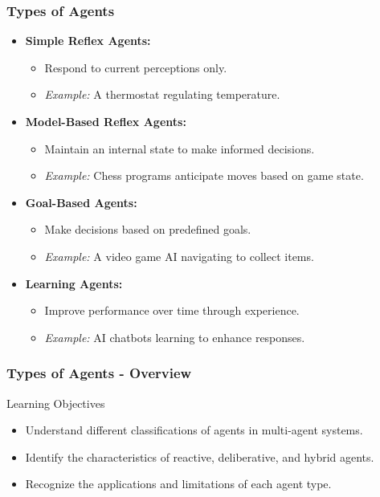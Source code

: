 \documentclass[aspectratio=169]{beamer}
\begin{document}
\begin{frame}[fragile]
    \frametitle{Types of Agents}
    \begin{itemize}
        \item \textbf{Simple Reflex Agents:} 
        \begin{itemize}
            \item Respond to current perceptions only.
            \item \textit{Example:} A thermostat regulating temperature.
        \end{itemize}

        \item \textbf{Model-Based Reflex Agents:} 
        \begin{itemize}
            \item Maintain an internal state to make informed decisions.
            \item \textit{Example:} Chess programs anticipate moves based on game state.
        \end{itemize}

        \item \textbf{Goal-Based Agents:}
        \begin{itemize}
            \item Make decisions based on predefined goals.
            \item \textit{Example:} A video game AI navigating to collect items.
        \end{itemize}

        \item \textbf{Learning Agents:}
        \begin{itemize}
            \item Improve performance over time through experience.
            \item \textit{Example:} AI chatbots learning to enhance responses.
        \end{itemize}
    \end{itemize}
\end{frame}

\begin{frame}[fragile]
    \frametitle{Types of Agents - Overview}
    \begin{block}{Learning Objectives}
        \begin{itemize}
            \item Understand different classifications of agents in multi-agent systems.
            \item Identify the characteristics of reactive, deliberative, and hybrid agents.
            \item Recognize the applications and limitations of each agent type.
        \end{itemize}
    \end{block}
\end{frame}
\end{document}
